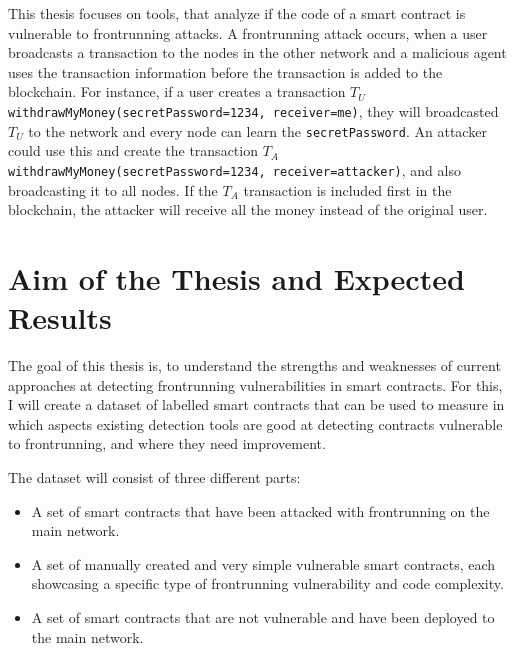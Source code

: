 \documentclass[paper=a4,fontsize=11pt,oneside,titlepage]{scrartcl}
\begin{document}
This thesis focuses on tools, that analyze if the code of a smart contract is vulnerable to frontrunning attacks. A frontrunning attack occurs, when a user broadcasts a transaction to the nodes in the other network and a malicious agent uses the transaction information before the transaction is added to the blockchain. For instance, if a user creates a transaction $T{_U}$ \verb|withdrawMyMoney(secretPassword=1234, receiver=me)|, they will broadcasted $T_{U}$ to the network and every node can learn the \verb|secretPassword|. An attacker could use this and create the transaction $T_A$ \\ \verb|withdrawMyMoney(secretPassword=1234, receiver=attacker)|, and also broadcasting it to all nodes. If the $T_A$ transaction is included first in the blockchain, the attacker will receive all the money instead of the original user.


\iffalse
\begin{itemize}
\item What is the problem to be studied? Why is it important?
\item Ethical considerations (if any)
\end{itemize}
\fi

\section{Aim of the Thesis and Expected Results}
\label{sec:results}

The goal of this thesis is, to understand the strengths and weaknesses of current approaches at detecting frontrunning vulnerabilities in smart contracts. For this, I will create a dataset of labelled smart contracts that can be used to measure in which aspects existing detection tools are good at detecting contracts vulnerable to frontrunning, and where they need improvement.

The dataset will consist of three different parts:

\begin{itemize}
  \item A set of smart contracts that have been attacked with frontrunning on the main network.
  \item A set of manually created and very simple vulnerable smart contracts, each showcasing a specific type of frontrunning vulnerability and code complexity.
  \item A set of smart contracts that are not vulnerable and have been deployed to the main network.
\end{itemize}
\end{document}
